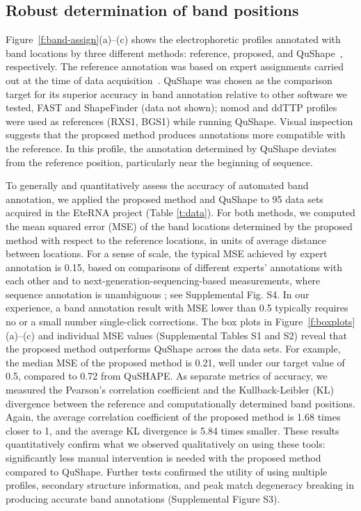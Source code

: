 \newcommand{\bP}{{\mathbf{P}}}

\subsection{Robust determination of band positions}\label{ss:band-position}
Figure~\ref{f:band-assign}(a)--(c) shows the electrophoretic profiles annotated with band locations by three different methods: reference, proposed, and QuShape~\citep{Karabiber2013}, respectively. The reference annotation was based on expert assignments carried out at the time of data acquisition~\citep{lee2014eterna}. QuShape was chosen as the comparison target for its superior accuracy in band annotation relative to other software we tested, FAST and ShapeFinder (data not shown); nomod and ddTTP profiles were used as references (RXS1, BGS1) while running QuShape. Visual inspection suggests that the proposed method produces annotations more compatible with the reference. In this profile, the annotation determined by QuShape deviates from the reference position, particularly near the beginning of sequence.

To generally and quantitatively assess the accuracy of automated band annotation, we applied the proposed method and QuShape to 95 data sets acquired in the EteRNA project (Table \ref{t:data}). For both methods, we computed the mean squared error (MSE) of the band locations determined by the proposed method with respect to the reference locations, in units of average distance between locations. For a sense of scale, the typical MSE achieved by expert annotation is 0.15, based on comparisons of different experts' annotations with each other and to next-generation-sequencing-based measurements, where sequence annotation is unambiguous \citep{Kladwang2014}; see Supplemental Fig. S4. In our experience, a band annotation result with MSE lower than 0.5 typically requires no or a small number single-click corrections. The box plots in Figure~\ref{f:boxplots}(a)--(c) and individual MSE values (Supplemental Tables S1 and S2) reveal that the proposed method outperforms QuShape across the data sets. For example, the median MSE of the proposed method is 0.21, well under our target value of 0.5, compared to 0.72 from QuSHAPE. As separate metrics of accuracy, we measured the Pearson's correlation coefficient and the Kullback-Leibler (KL) divergence between the reference and computationally determined band positions.  Again, the average correlation coefficient of the proposed method is 1.68 times closer to 1, and the average KL divergence is 5.84 times smaller. These results quantitatively confirm what we observed qualitatively on using these tools: significantly less manual intervention is needed with the proposed method compared to QuShape. Further tests confirmed the utility of using multiple profiles, secondary structure information, and peak match degeneracy breaking in producing accurate band annotations (Supplemental Figure S3).

